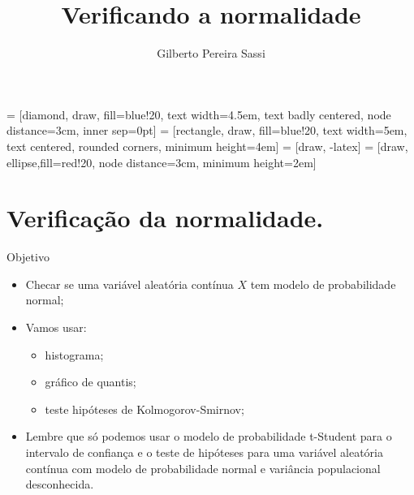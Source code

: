 \documentclass[10pt]{beamer}
\date{}
\title[Teste de Hipóteses]{Verificando a normalidade}
\author[Gilberto Sassi]{Gilberto Pereira Sassi}
\institute[IME -- UFBA]{Universidade Federal da Bahia \\ Instituto de Matem\'{a}tica e Estat\'{i}stica\\ Departamento de Estat\'{i}stica }
\begin{document}
	
 = [diamond, draw, fill=blue!20, 
text width=4.5em, text badly centered, node distance=3cm, inner sep=0pt]
 = [rectangle, draw, fill=blue!20, 
text width=5em, text centered, rounded corners, minimum height=4em]
 = [draw, -latex]
 = [draw, ellipse,fill=red!20, node distance=3cm,
minimum height=2em]
	
\begin{frame}{}
	\maketitle
\end{frame}

\section{Verificação da normalidade.}

\begin{frame}{}
 \begin{block}{Objetivo}
 	\begin{itemize}
 		\item Checar se uma variável aleatória contínua $X$ tem modelo de probabilidade normal;
 		\item Vamos usar:
 		\begin{itemize}
 			\item histograma;
 			\item gráfico de quantis;
 			\item teste hipóteses de Kolmogorov-Smirnov;
 		\end{itemize}
 	\item Lembre que só podemos usar o modelo de probabilidade t-Student para o intervalo de confiança e o teste de hipóteses para uma variável aleatória contínua com modelo de probabilidade normal e variância populacional desconhecida.
 	\end{itemize} 
 \end{block}
 

\end{frame}
\end{document}
